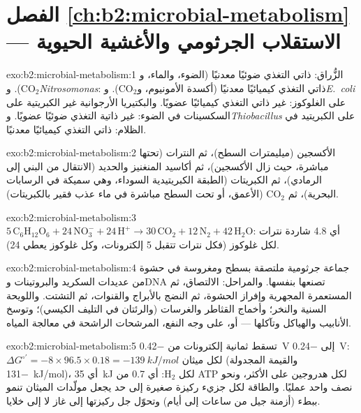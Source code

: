 \section*{الفصل \ref{ch:b2:microbial-metabolism} --- الاستقلاب الجرثومي والأغشية الحيوية}

\begin{solution}{exo:b2:microbial-metabolism:1}
الزُّراق: ذاتي التغذي ضوئيًا معدنيًا (الضوء، والماء،
و$\mathrm{CO_2}$). و\emph{Nitrosomonas}: ذاتي التغذي كيميائيًا
معدنيًا (أكسدة الأمونيوم، و$\mathrm{CO_2}$). و\emph{E.~coli} على
الغلوكوز: غير ذاتي التغذي كيميائيًا عضويًا. والبكتيريا الأرجوانية
غير الكبريتية على السكسينات في الضوء: غير ذاتية التغذي ضوئيًا
عضويًا. و\emph{Thiobacillus} على الكبريتيد في الظلام: ذاتي التغذي
كيميائيًا معدنيًا.
\end{solution}

\begin{solution}{exo:b2:microbial-metabolism:2}
الأكسجين (ميليمترات السطح)، ثم النترات (تحتها مباشرة، حيث زال
الأكسجين)، ثم أكاسيد المنغنيز والحديد (الانتقال من البني إلى
الرمادي)، ثم الكبريتات (الطبقة الكبريتيدية السوداء، وهي سميكة في
الرسابات البحرية)، ثم $\mathrm{CO_2}$  (الأعمق، أو
تحت السطح مباشرة في ماء عذب فقير بالكبريتات).
\end{solution}

\begin{solution}{exo:b2:microbial-metabolism:3}
$5\,\mathrm{C_6H_{12}O_6} + 24\,\mathrm{NO_3^-} + 24\,\mathrm{H^+}
\to 30\,\mathrm{CO_2} + 12\,\mathrm{N_2} + 42\,\mathrm{H_2O}$: أي 4.8
شاردة نترات لكل غلوكوز (فكل نترات تتقبل 5 إلكترونات، وكل غلوكوز
يعطي 24).
\end{solution}

\begin{solution}{exo:b2:microbial-metabolism:4}
جماعة جرثومية ملتصقة بسطح ومغروسة في حشوة من عديدات السكريد
والبروتينات وDNA تصنعها بنفسها. والمراحل: الالتصاق، ثم المستعمرة
المجهرية وإفراز الحشوة، ثم النضج بالأبراج والقنوات، ثم التشتت.
واللويحة السنية والنخر؛ وأخماج القثاطر والغرسات (والرئتان في التليف
الكيسي)؛ وتوسخ الأنابيب والهياكل وتآكلها --- أو، على وجه النفع،
المرشحات الراشحة في معالجة المياه.
\end{solution}

\begin{solution}{exo:b2:microbial-metabolism:5}
تسقط ثمانية إلكترونات من \qty{-0.42}{V} إلى \qty{-0.24}{V}:
$\Delta G^{\circ\prime} = -8\times 96.5\times 0.18 =
\qty{-139}{kJ/mol}$ لكل ميثان (والقيمة المجدولة \qty{-131}{kJ/mol})،
أي \qty{35}{kJ} لكل $\mathrm{H_2}$: أي 0.7 من ATP لكل هدروجين على
الأكثر، ونحو نصف واحد عمليًا. والطاقة لكل جزيء ركيزة صغيرة إلى حد
يجعل مولّدات الميثان تنمو ببطء (أزمنة جيل من ساعات إلى أيام) وتحوّل
جل ركيزتها إلى غاز لا إلى خلايا.
\end{solution}

